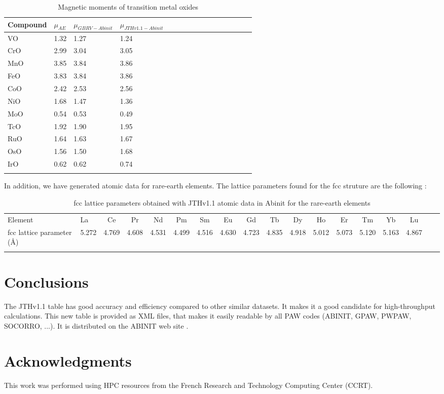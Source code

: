 \documentclass[10pt]{revtex4}
\begin{document}
\begin{table}[h]
\begin{tabular}{llllllllllllcccc}
\\\hline
 Compound& $\mu_{AE}$   &  $\mu_{GBRV-Abinit}$   &   $\mu_{JTHv1.1-Abinit}$ \\
\hline
 VO &  1.32  &  1.27 & 1.24  \\
 CrO & 2.99  &  3.04 & 3.05  \\
 MnO &  3.85  &  3.84 & 3.86  \\
 FeO &  3.83  &  3.84 & 3.86  \\
 CoO &  2.42  &  2.53 & 2.56  \\
 NiO &  1.68  &  1.47 & 1.36  \\
 MoO &  0.54  &  0.53 & 0.49  \\
 TcO &  1.92  &  1.90 & 1.95  \\
 RuO &  1.64  &  1.63 & 1.67  \\
 OsO &  1.56  &  1.50 & 1.68  \\
 IrO &  0.62  &  0.62 & 0.74  \\
\\\hline
\end{tabular}
\caption{Magnetic moments of transition metal oxides  }
\label{tab2}
\end{table}


In addition, we have generated atomic data for rare-earth elements. The lattice parameters found for the fcc struture are the following \label{tab3}:
\begin{table}[h]
\begin{tabular}{llcccccccccccccccc}
\\\hline
Element & La & Ce & Pr & Nd & Pm & Sm & Eu & Gd & Tb & Dy & Ho & Er & Tm & Yb & Lu  \\
fcc lattice parameter (\AA) & 5.272 & 4.769 & 4.608 & 4.531 & 4.499 & 4.516 & 4.630 & 4.723 & 4.835 & 4.918 & 5.012 & 5.073 & 5.120 & 5.163 & 4.867  \\
\\\hline
\end{tabular}
\caption{fcc lattice parameters obtained with JTHv1.1 atomic data in Abinit for the rare-earth elements }
\label{tab3}
\end{table}


\section{Conclusions}

 The JTHv1.1 table has good accuracy and efficiency compared to other similar datasets. It makes it a good candidate for high-throughput calculations. This new table is provided as XML files, that makes it easily readable by all PAW codes (ABINIT, GPAW, PWPAW, SOCORRO, ...). It is distributed on the ABINIT web site \cite{web3}. 

\section{Acknowledgments}

This work was performed using HPC resources from the French Research and Technology Computing Center (CCRT).  



%

\end{document}
